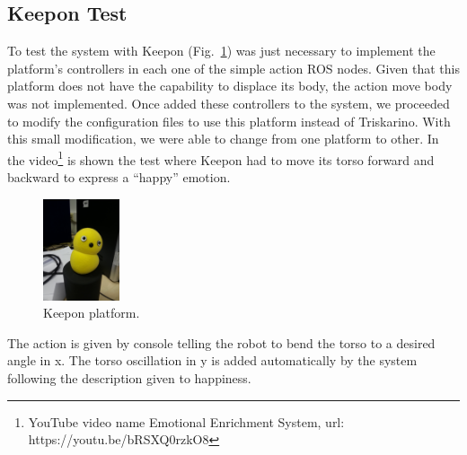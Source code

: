 \subsection{Keepon Test}
To test the system with Keepon (Fig.~\ref{fig:keepon}) was just necessary to implement the platform's controllers in each one of the simple action ROS nodes. Given that this platform does not have the capability to displace its body, the action move body was not implemented. Once added these controllers to the system, we proceeded to modify the configuration files to use this platform instead of Triskarino. With this small modification, we were able to change from one platform to other. In the video\footnote{YouTube video name Emotional Enrichment System, url: https://youtu.be/bRSXQ0rzkO8}
is shown the test where Keepon had to move its torso forward and backward to express a ``happy'' emotion. 
\begin{figure}
	\centering
	\includegraphics[width=0.2\textwidth]{./Images/Keepon.jpg}
	\caption{Keepon platform.}
	\label{fig:keepon}
\end{figure} 
The action is given by console telling the robot to bend the torso to a desired angle in x. The torso oscillation in y is added automatically by the system following the description given to happiness. 

